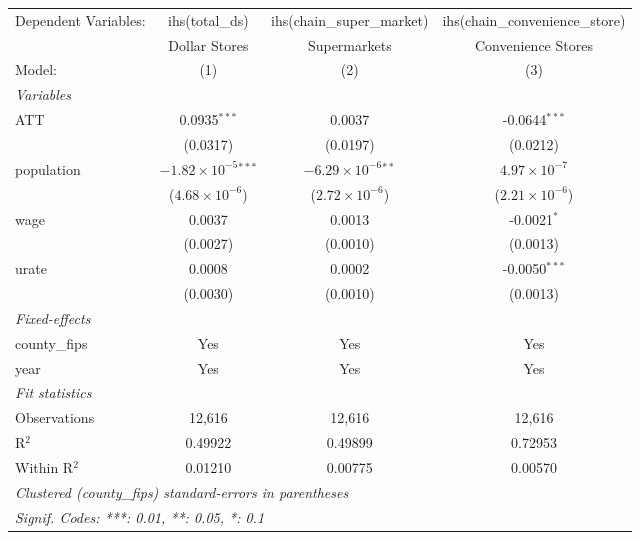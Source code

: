 
\begingroup
\centering
\begin{tabular}{lccc}
   \tabularnewline \midrule \midrule
   Dependent Variables: & ihs(total\_ds)                 & ihs(chain\_super\_market)     & ihs(chain\_convenience\_store)\\    
                        & Dollar Stores                  & Supermarkets                  & Convenience Stores \\   
   Model:               & (1)                            & (2)                           & (3)\\  
   \midrule
   \emph{Variables}\\
   ATT                  & 0.0935$^{***}$                 & 0.0037                        & -0.0644$^{***}$\\   
                        & (0.0317)                       & (0.0197)                      & (0.0212)\\   
   population           & $-1.82\times 10^{-5}$$^{***}$  & $-6.29\times 10^{-6}$$^{**}$  & $4.97\times 10^{-7}$\\    
                        & ($4.68\times 10^{-6}$)         & ($2.72\times 10^{-6}$)        & ($2.21\times 10^{-6}$)\\    
   wage                 & 0.0037                         & 0.0013                        & -0.0021$^{*}$\\   
                        & (0.0027)                       & (0.0010)                      & (0.0013)\\   
   urate                & 0.0008                         & 0.0002                        & -0.0050$^{***}$\\   
                        & (0.0030)                       & (0.0010)                      & (0.0013)\\   
   \midrule
   \emph{Fixed-effects}\\
   county\_fips         & Yes                            & Yes                           & Yes\\  
   year                 & Yes                            & Yes                           & Yes\\  
   \midrule
   \emph{Fit statistics}\\
   Observations         & 12,616                         & 12,616                        & 12,616\\  
   R$^2$                & 0.49922                        & 0.49899                       & 0.72953\\  
   Within R$^2$         & 0.01210                        & 0.00775                       & 0.00570\\  
   \midrule \midrule
   \multicolumn{4}{l}{\emph{Clustered (county\_fips) standard-errors in parentheses}}\\
   \multicolumn{4}{l}{\emph{Signif. Codes: ***: 0.01, **: 0.05, *: 0.1}}\\
\end{tabular}
\par\endgroup



